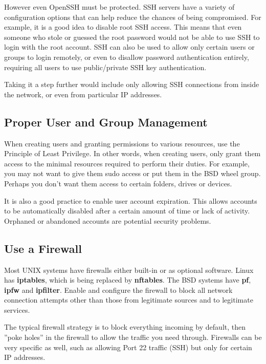 However even OpenSSH must be protected.  SSH servers have a variety of configuration options that can help reduce the chances of being compromised.  For example, it is a good idea to disable root SSH access.  This means that even someone who stole or guessed the root password would not be able to use SSH to login with the root account.  SSH can also be used to allow only certain users or groups to login remotely, or even to disallow password authentication entirely, requiring all users to use public/private SSH key authentication.

Taking it a step further would include only allowing SSH connections from inside the network, or even from particular IP addresses.

\subsection{Proper User and Group Management}

When creating users and granting permissions to various resources, use the Principle of Least Privilege.  In other words, when creating users, only grant them access to the minimal resources required to perform their duties.  For example, you may not want to give them sudo access or put them in the BSD wheel group.  Perhaps you don't want them access to certain folders, drives or devices.

It is also a good practice to enable user account expiration.  This allows accounts to be automatically disabled after a certain amount of time or lack of activity.  Orphaned or abandoned accounts are potential security problems.

\subsection{Use a Firewall}

Most UNIX systems have firewalls either built-in or as optional software.  Linux has \textbf{iptables}, which is being replaced by \textbf{nftables}.  The BSD systems have \textbf{pf}, \textbf{ipfw} and \textbf{ipfilter}.  Enable and configure the firewall to block all network connection attempts other than those from legitimate sources and to legitimate services.

The typical firewall strategy is to block everything incoming by default, then ''poke holes'' in the firewall to allow the traffic you need through.  Firewalls can be very specific as well, such as allowing Port 22 traffic (SSH) but only for certain IP addresses.  

